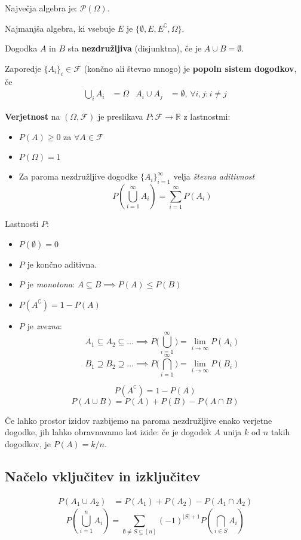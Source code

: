 \begin{multicols}{5}
Največja algebra je: $\mathcal{P}(\Omega)$.

Najmanjša algebra, ki vsebuje $E$ je $\{ \emptyset, E, E^\complement, \Omega \}$.

Dogodka $A$ in $B$ sta \textbf{nezdružljiva} (disjunktna), če je $A \cup B = \emptyset$.

Zaporedje $\{ A_i \}_i \in \mathcal{F}$ (končno ali števno mnogo) je \textbf{popoln sistem dogodkov}, če
\begin{align*}
	\bigcup_i A_i &= \Omega & A_i \cup A_j &= \emptyset, \, \forall i,j: i\neq j
\end{align*}


\textbf{Verjetnost} na $(\Omega, \mathcal{F})$ je preslikava $P: \mathcal{F} \to \mathbb{R}$ z lastnostmi:

\begin{itemize}
	\item $P(A) \geq 0$ za $\forall A \in \mathcal{F}$
	\item $P(\Omega) = 1$
	\item Za paroma nezdružljive dogodke $\{ A_i \}_{i=1}^\infty $ velja \textit{števna aditivnost}
	\[ P(\bigcup_{i=1}^\infty A_i) = \sum_{i=1}^\infty P(A_i)\]
\end{itemize}

Lastnosti $P$:
\begin{itemize}
	\item $P(\emptyset) = 0$
	\item $P$ je končno aditivna.
	\item $P$ je \textit{monotona}: $A \subseteq B \implies P(A) \leq P(B)$
	\item $P(A^\complement) = 1 - P(A)$
	\item $P$ je \textit{zvezna}:
	\[ A_1 \subseteq A_2 \subseteq \dots \implies P\big(\bigcup_{i=1}^\infty\big) = \lim_{i \to \infty} P(A_i)\]
	\[ B_1 \supseteq B_2 \supseteq \dots \implies P\big(\bigcap_{i=1}^\infty\big) = \lim_{i \to \infty} P(B_i)\]
\end{itemize}


\[P(A^\complement) = 1 - P(A)\]
\[ P(A \cup B) = P(A) + P(B) - P(A \cap B) \]

Če lahko prostor izidov razbijemo na paroma nezdružljive enako verjetne dogodke, jih lahko obravnavamo kot izide: če je dogodek $A$ unija $k$ od $n$ takih dogodkov, je $P(A) = k/n$.

\subsection{Načelo vključitev in izključitev}
\begin{align*}
	P(A_1 \cup A_2) &= P(A_1) + P(A_2) - P(A_1 \cap A_2)
\end{align*}
\[ P( \bigcup_{i=1}^n A_i) = \sum_{\emptyset \neq S \subseteq [n]} (-1)^{|S|+1} P(\bigcap_{i\in S} A_i)\]


\end{multicols}
